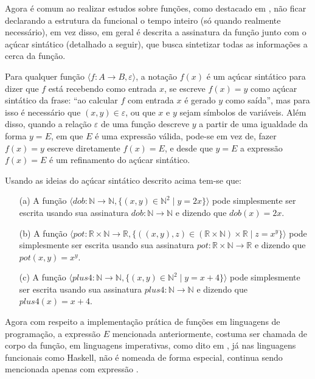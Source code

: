 Agora é comum ao realizar estudos sobre funções, como destacado em \cite{carmo2013}, não ficar declarando a estrutura da funcional o tempo inteiro (só quando realmente necessário), em vez disso, em geral é descrita a assinatura da função junto com o açúcar sintático (detalhado a seguir), que busca sintetizar todas as informações a cerca da função.

\begin{atencao}
  Para qualquer função  $\langle f: A \rightarrow B, \varepsilon \rangle$, a notação $f(x)$ é um açúcar sintático para dizer que $f$ está recebendo como entrada $x$, se escreve $f(x) = y$ como açúcar sintático da frase: ``ao calcular $f$ com entrada $x$ é gerado $y$ como saída'', mas para isso é necessário que $(x, y) \in \varepsilon$, ou que $x$ e $y$ sejam símbolos de variáveis. Além disso, quando a relação $\varepsilon$ de uma função descreve $y$ a partir de uma igualdade da forma $y = E$, em que $E$ é uma expressão válida, pode-se em vez de, fazer $f(x) = y$ escreve diretamente $f(x) = E$, e desde que $y = E$ a expressão $f(x) = E$ é um refinamento do açúcar sintático.
\end{atencao}

\begin{exemplo}
	Usando as ideias do açúcar sintático descrito acima tem-se que:
	\begin{itemize}
		\item[(a)] A função  $\langle dob: \mathbb{N} \rightarrow  \mathbb{N},  \{(x, y) \in \mathbb{N}^2 \mid  y = 2x\} \rangle$ pode simplesmente ser escrita usando sua assinatura $dob:\mathbb{N} \rightarrow  \mathbb{N}$ e dizendo que $dob(x) = 2x$.
		\item[(b)] A função  $\langle pot: \mathbb{R} \times \mathbb{N} \rightarrow  \mathbb{R},  \{((x, y), z) \in (\mathbb{R} \times \mathbb{N}) \times \mathbb{R} \mid  z = x^y\} \rangle$ pode simplesmente ser escrita usando sua assinatura $pot: \mathbb{R} \times \mathbb{N} \rightarrow  \mathbb{R}$ e dizendo que $pot(x, y) = x^y$.
		\item[(c)] A função  $\langle plus4: \mathbb{N} \rightarrow  \mathbb{N},  \{(x, y) \in \mathbb{N}^2 \mid  y = x + 4\} \rangle$ pode simplesmente ser escrita usando sua assinatura $plus4:\mathbb{N} \rightarrow  \mathbb{N}$ e dizendo que $plus4(x) = x + 4$.
	\end{itemize}
\end{exemplo}

Agora com respeito a implementação prática de funções em linguagens de programação, a expressão $E$ mencionada anteriormente, costuma ser chamada de corpo da função, em linguagens imperativas, como dito em \cite{pythonOrg, medina2006}, já nas linguagens funcionais como Haskell, não é nomeada de forma especial, continua sendo mencionada apenas com expressão \cite{learnHaskell2011, beginningHaskell}.

